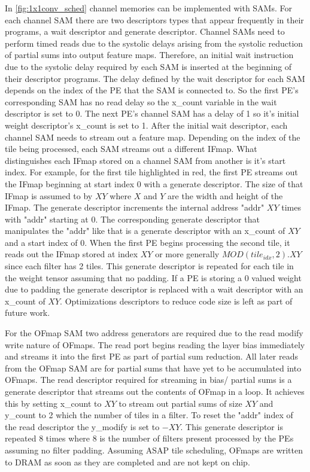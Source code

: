 In \autoref{fig:1x1conv_sched} channel memories can be implemented with SAMs.
For each channel SAM there are two descriptors types that appear frequently in
their programs, a wait descriptor and generate descriptor. Channel SAMs need to
perform timed reads due to the systolic delays arising from the systolic
reduction of partial sums into output feature maps. Therefore, an initial wait
instruction due to the systolic delay required by each SAM is inserted at the
beginning of their descriptor programs. The delay defined by the wait descriptor
for each SAM depends on the index of the PE that the SAM is connected to. So the
first PE's corresponding SAM has no read delay so the x\_count variable in the
wait descriptor is set to 0. The next PE's channel SAM has a delay of 1 so it's
initial weight descriptor's x\_count is set to 1. After the initial wait
descriptor, each channel SAM needs to stream out a feature map. Depending on the
index of the tile being processed, each SAM streams out a different IFmap. What
distinguishes each IFmap stored on a channel SAM from another is it's start
index. For example, for the first tile highlighted in red, the first PE streams
out the IFmap beginning at start index 0 with a generate descriptor. The size of
that IFmap is assumed to by $XY$ where $X$ and $Y$ are the width and height of
the IFmap. The generate descriptor increments the internal address "addr" $XY$
times with "addr" starting at 0. The corresponding generate descriptor that
manipulates the "addr" like that is a generate descriptor with an x\_count of
$XY$ and a start index of 0. When the first PE begins processing the second
tile, it reads out the IFmap stored at index $XY$ or more generally
$MOD(tile_{idx},2).XY$ since each filter has 2 tiles. This generate descriptor
is repeated for each tile in the weight tensor assuming that no padding. If a PE
is storing a 0 valued weight due to padding the generate descriptor is replaced
with a wait descriptor with an x\_count of $XY$. Optimizations descriptors to
reduce code size is left as part of future work.

For the OFmap SAM two address generators are required due to the read modify
write nature of OFmaps. The read port begins reading the layer bias immediately
and streams it into the first PE as part of partial sum reduction. All later
reads from the OFmap SAM are for partial sums that have yet to be accumulated
into OFmaps. The read descriptor required for streaming in bias/ partial sums is
a generate descriptor that streams out the contents of OFmap in a loop. It
achieves this by setting x\_count to $XY$ to stream out partial sums of size
$XY$ and y\_count to 2 which the number of tiles in a filter. To reset the
"addr" index of the read descriptor the y\_modify is set to $-XY$. This generate
descriptor is repeated 8 times where 8 is the number of filters present
processed by the PEs assuming no filter padding. Assuming ASAP tile scheduling,
OFmaps are written to DRAM as soon as they are completed and are not kept on
chip.


